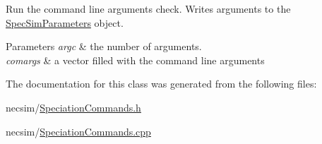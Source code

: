 Run the command line arguments check. Writes arguments to the \hyperlink{struct_spec_sim_parameters}{Spec\+Sim\+Parameters} object. 


\begin{DoxyParams}{Parameters}
{\em argc} & the number of arguments. \\
\hline
{\em comargs} & a vector filled with the command line arguments \\
\hline
\end{DoxyParams}


The documentation for this class was generated from the following files\+:\begin{DoxyCompactItemize}
\item 
necsim/\hyperlink{_speciation_commands_8h}{Speciation\+Commands.\+h}\item 
necsim/\hyperlink{_speciation_commands_8cpp}{Speciation\+Commands.\+cpp}\end{DoxyCompactItemize}
